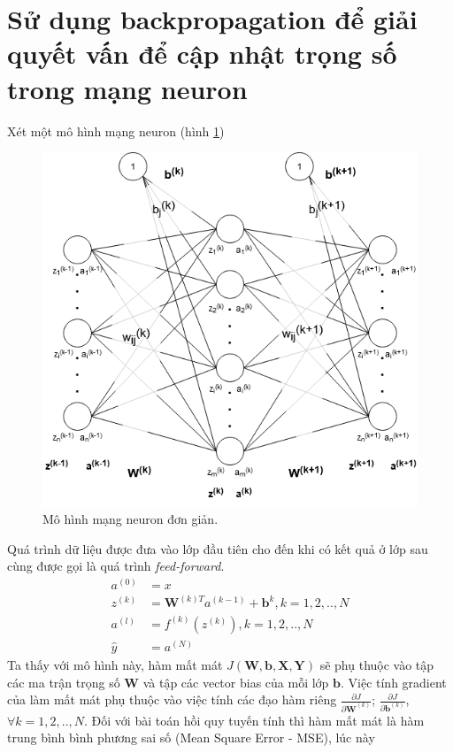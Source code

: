 \section{Sử dụng backpropagation để giải quyết vấn để cập nhật trọng số trong mạng neuron}
Xét một mô hình mạng neuron (hình \ref{fig:ann})
\begin{figure}[ht!]
	\centerline{\includegraphics[scale=0.6]{images/ann.png}}
  	\caption{Mô hình mạng neuron đơn giản.}
  	\label{fig:ann}
\end{figure}
Quá trình dữ liệu được đưa vào lớp đầu tiên cho đến khi có kết quả ở lớp sau cùng được gọi là quá trình \emph{feed-forward}.
\begin{align*}
	a^{(0)}&=x \\
	z^{(k)}&={\boldsymbol{W}^{(k)T}}{a^{(k-1)}}+{\boldsymbol{b}}^k,k=1,2,..,N \\
	a^{(l)}&=f^{(k)}\left(z^{(k)}\right),k=1,2,..,N \\
	\widehat{y}&=a^{(N)}
\end{align*}
Ta thấy với mô hình này, hàm mất mát $J\left({\boldsymbol{W}},{\boldsymbol{b}},{\boldsymbol{X}},{\boldsymbol{Y}}\right)$ sẽ phụ thuộc vào tập các ma trận trọng số $\boldsymbol{W}$ và tập các vector bias của mỗi lớp $\boldsymbol{b}$. Việc tính gradient của làm mất mát phụ thuộc vào việc tính các đạo hàm riêng ${\frac{{\partial}J}{{{\partial}\boldsymbol{W}}^{(k)}}}$; ${\frac{{\partial}J}{{\partial}\boldsymbol{b}^{(k)}}}$, ${\forall}k=1,2,..,N$. Đối với bài toán hồi quy tuyến tính thì hàm mất mát là hàm trung bình bình phương sai số (Mean Square Error - MSE), lúc này
